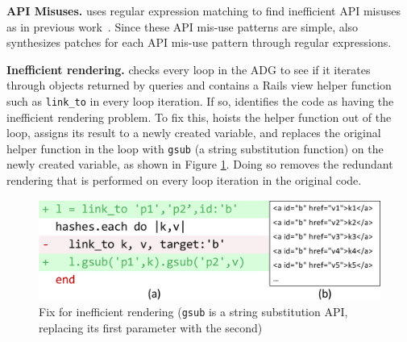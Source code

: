 
\textbf{API Misuses.} 
\Tool uses regular expression matching to find inefficient API misuses as in previous work~\cite{junwen:icse2018}.
Since these API mis-use patterns are simple, \Tool also synthesizes patches for each API mis-use pattern through regular expressions. %


\textbf{Inefficient rendering.} \Tool checks every loop in the ADG to see if it iterates through objects returned by queries and contains a Rails view helper function 
such as {\tt link\_to} in every loop iteration.
If so, \Tool identifies the code as having the inefficient rendering
problem. To fix this, \Tool  
hoists the helper function out of the loop, assigns its result to a newly created variable, and replaces the original
helper function in the loop with {\tt gsub} (a string substitution function) on the newly created variable, as shown in Figure \ref{fig:rendering}. Doing so removes the redundant rendering that is performed on every loop iteration in the original code.

\begin{figure}
    \centering
    \includegraphics[width=0.7\columnwidth]{figs/rendering.pdf}
    \caption{Fix for inefficient rendering %
    \textmd{({\tt gsub} is a string substitution API, replacing its first parameter with the second)}
    }
    \label{fig:rendering}

\end{figure}

